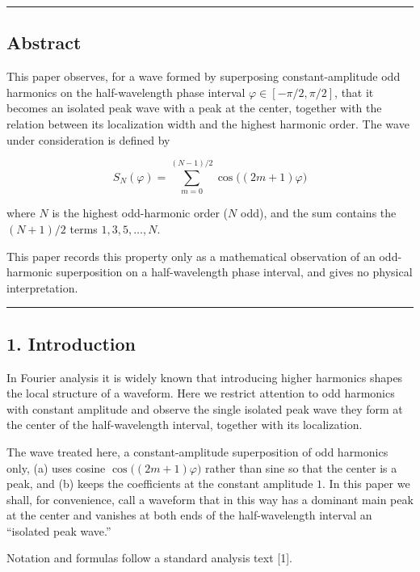 \documentclass[
]{ltjsarticle}
\begin{document}
\begin{center}\rule{0.5\linewidth}{0.5pt}\end{center}

\subsection{Abstract}\label{abstract}

This paper observes, for a wave formed by superposing constant-amplitude
odd harmonics on the half-wavelength phase interval
\(\varphi\in[-\pi/2,\pi/2]\), that it becomes an isolated peak wave with
a peak at the center, together with the relation between its
localization width and the highest harmonic order. The wave under
consideration is defined by

\[
S_N(\varphi)=\sum_{m=0}^{(N-1)/2}\cos\!\big((2m+1)\varphi\big)
\]

where \(N\) is the highest odd-harmonic order (\(N\) odd), and the sum
contains the \((N+1)/2\) terms \(1,3,5,\dots,N\).

This paper records this property only as a mathematical observation of
an odd-harmonic superposition on a half-wavelength phase interval, and
gives no physical interpretation.

\begin{center}\rule{0.5\linewidth}{0.5pt}\end{center}

\subsection{1. Introduction}\label{introduction}

In Fourier analysis it is widely known that introducing higher harmonics
shapes the local structure of a waveform. Here we restrict attention to
odd harmonics with constant amplitude and observe the single isolated
peak wave they form at the center of the half-wavelength interval,
together with its localization.

The wave treated here, a constant-amplitude superposition of odd
harmonics only, (a) uses cosine \(\cos\!\big((2m+1)\varphi\big)\) rather
than sine so that the center is a peak, and (b) keeps the coefficients
at the constant amplitude \(1\). In this paper we shall, for
convenience, call a waveform that in this way has a dominant main peak
at the center and vanishes at both ends of the half-wavelength interval
an ``isolated peak wave.''

Notation and formulas follow a standard analysis text {[}1{]}.
\end{document}
